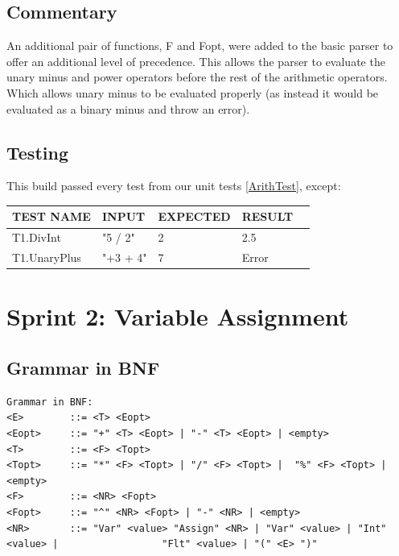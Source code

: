\documentclass[a4paper, oneside, 11pt]{report}
\begin{document}
    \subsection{Commentary}
    An additional pair of functions, F and Fopt, were added to the basic parser to offer an additional level of precedence.
    This allows the parser to evaluate the unary minus and power operators before the rest of the arithmetic operators.
    Which allows unary minus to be evaluated properly (as instead it would be evaluated as a binary minus and throw an error).


    \subsection{Testing}
    This build passed every test from our unit tests \ref{ArithTest}, except:

    \begin{center}
        \begin{tabular}{|p{1.5in}|p{1.5in}|p{1in}|p{1.6in}|p{2.4in}|}
            \hline
            TEST NAME & INPUT & EXPECTED & RESULT \\
            \hline
            T1.DivInt & "5 / 2" & 2 & 2.5 \\
            \hline
            T1.UnaryPlus & "+3 + 4" & 7 & Error \\
            \hline
        \end{tabular}
    \end{center}


    \clearpage
    \section{Sprint 2: Variable Assignment}
    \subsection{Grammar in BNF}
    \begin{verbatim}
Grammar in BNF:
<E>        ::= <T> <Eopt>
<Eopt>     ::= "+" <T> <Eopt> | "-" <T> <Eopt> | <empty>
<T>        ::= <F> <Topt>
<Topt>     ::= "*" <F> <Topt> | "/" <F> <Topt> |  "%" <F> <Topt> |<empty>
<F>        ::= <NR> <Fopt>
<Fopt>     ::= "^" <NR> <Fopt> | "-" <NR> | <empty>
<NR>       ::= "Var" <value> "Assign" <NR> | "Var" <value> | "Int" <value> |                  "Flt" <value> | "(" <E> ")"

    \end{verbatim}
\end{document}
